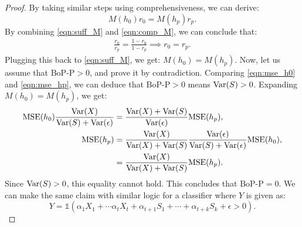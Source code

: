 \begin{proof}
    By taking similar steps using comprehensiveness, we can derive: 
    \begin{equation}  \label{eqn:comp_M}
         M(h_0) r_{0} =  M(h_p)  r_{p}.
    \end{equation}
By combining \eqref{eqn:suff_M}  and \eqref{eqn:comp_M}, we can conclude that: 
\begin{align*}
    \frac{r_{0}}{r_{p}} = \frac{1-r_{0}}{1-r_{p}} \implies r_{0} = r_{p}.
\end{align*}
Plugging this back to  \eqref{eqn:suff_M}, we get: $M(h_0) = M(h_p)$. Now, let us assume that $\text{BoP-P} > 0$, and prove it by contradiction. Comparing \eqref{eqn:mse_h0} and \eqref{eqn:mse_hp}, we can deduce that  $\text{BoP-P} > 0$ means $\text{Var}(S) > 0$. Expanding $M(h_0) = M(h_p)$, we get: 
\begin{align*}
    \text{MSE}(h_0)  \frac{\text{Var}(X)}{\text{Var}(S) + \text{Var}(\epsilon)} &= \frac{\text{Var}(X) + \text{Var}(S)}{\text{Var}(\epsilon)} \text{MSE} (h_p), \\ 
    \text{MSE} (h_p)  &= \frac{\text{Var}(X)}{ \text{Var}(X) + \text{Var}(S) } \frac{\text{Var}(\epsilon)}{ \text{Var}(S) + \text{Var}(\epsilon) }  \text{MSE}(h_0), \\ 
    &=  \frac{\text{Var}(X)}{ \text{Var}(X) + \text{Var}(S) }   \text{MSE} (h_p).
\end{align*}
Since $\text{Var}(S) > 0$, this equality cannot hold. This concludes that $\text{BoP-P} = 0$. We can make the same claim with similar logic for a classifier where $Y$ is given as: 
\begin{equation}
     Y = \mathds{1} (\alpha_1 X_1 + \cdots \alpha_t X_t + \alpha_{t+1} S_1 + \cdots + \alpha_{t+k} S_k + \epsilon > 0).
\end{equation}
\end{proof}

